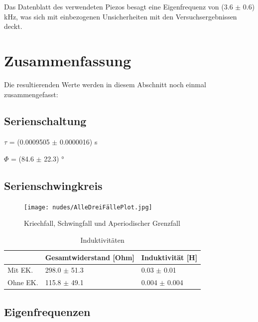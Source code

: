 \documentclass[12pt,a4paper,twoside]{article}
\begin{document}
\noindent
Das Datenblatt des verwendeten Piezos besagt eine Eigenfrequenz von (3.6 $\pm$ 0.6) kHz, was sich mit einbezogenen Unsicherheiten mit den Versuchsergebnissen deckt.



\section{Zusammenfassung} %

Die resultierenden Werte werden in diesem Abschnitt noch einmal zusammengefasst:

\subsection{Serienschaltung}

$\tau$ = (0.0009505 $\pm$ 0.0000016) s \newline

\noindent
$\Phi$ = (84.6 $\pm$ 22.3) °


\subsection{Serienschwingkreis}

\begin{figure}[H]
    \centering
    \texttt{[image: nudes/AlleDreiFällePlot.jpg]}
    \caption{Kriechfall, Schwingfall und Aperiodischer Grenzfall}
    \label{fig:AlleDreiFälleZusmf}
\end{figure}

\begin{table}[H]
    \centering
    \caption{Induktivitäten}
    \label{tab:Induktivitäten}
    \begin{tabular}{| l | l | l |}
        \hline
         & Gesamtwiderstand [Ohm] & Induktivität [H] \\
        \hline
        Mit EK. & 298.0 $\pm$ 51.3 & 0.03 $\pm$ 0.01 \\
        Ohne EK. & 115.8 $\pm$ 49.1 & 0.004 $\pm$ 0.004 \\
        \hline
    \end{tabular}
\end{table}


\subsection{Eigenfrequenzen}
\end{document}
